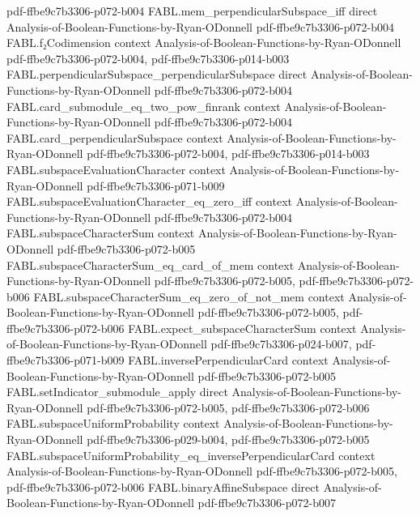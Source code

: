 \begin{theorem}
  {pdf-ffbe9c7b3306-p072-b004}
\proofstep
  {FABL.mem_perpendicularSubspace_iff}
  {direct}
  {Analysis-of-Boolean-Functions-by-Ryan-ODonnell}
  {pdf-ffbe9c7b3306-p072-b004}
\proofstep
  {FABL.f₂Codimension}
  {context}
  {Analysis-of-Boolean-Functions-by-Ryan-ODonnell}
  {pdf-ffbe9c7b3306-p072-b004,
    pdf-ffbe9c7b3306-p014-b003}
\proofstep
  {FABL.perpendicularSubspace_perpendicularSubspace}
  {direct}
  {Analysis-of-Boolean-Functions-by-Ryan-ODonnell}
  {pdf-ffbe9c7b3306-p072-b004}
\proofstep
  {FABL.card_submodule_eq_two_pow_finrank}
  {context}
  {Analysis-of-Boolean-Functions-by-Ryan-ODonnell}
  {pdf-ffbe9c7b3306-p072-b004}
\proofstep
  {FABL.card_perpendicularSubspace}
  {context}
  {Analysis-of-Boolean-Functions-by-Ryan-ODonnell}
  {pdf-ffbe9c7b3306-p072-b004,
    pdf-ffbe9c7b3306-p014-b003}
\proofstep
  {FABL.subspaceEvaluationCharacter}
  {context}
  {Analysis-of-Boolean-Functions-by-Ryan-ODonnell}
  {pdf-ffbe9c7b3306-p071-b009}
\proofstep
  {FABL.subspaceEvaluationCharacter_eq_zero_iff}
  {context}
  {Analysis-of-Boolean-Functions-by-Ryan-ODonnell}
  {pdf-ffbe9c7b3306-p072-b004}
\proofstep
  {FABL.subspaceCharacterSum}
  {context}
  {Analysis-of-Boolean-Functions-by-Ryan-ODonnell}
  {pdf-ffbe9c7b3306-p072-b005}
\proofstep
  {FABL.subspaceCharacterSum_eq_card_of_mem}
  {context}
  {Analysis-of-Boolean-Functions-by-Ryan-ODonnell}
  {pdf-ffbe9c7b3306-p072-b005,
    pdf-ffbe9c7b3306-p072-b006}
\proofstep
  {FABL.subspaceCharacterSum_eq_zero_of_not_mem}
  {context}
  {Analysis-of-Boolean-Functions-by-Ryan-ODonnell}
  {pdf-ffbe9c7b3306-p072-b005,
    pdf-ffbe9c7b3306-p072-b006}
\proofstep
  {FABL.expect_subspaceCharacterSum}
  {context}
  {Analysis-of-Boolean-Functions-by-Ryan-ODonnell}
  {pdf-ffbe9c7b3306-p024-b007,
    pdf-ffbe9c7b3306-p071-b009}
\proofstep
  {FABL.inversePerpendicularCard}
  {context}
  {Analysis-of-Boolean-Functions-by-Ryan-ODonnell}
  {pdf-ffbe9c7b3306-p072-b005}
\proofstep
  {FABL.setIndicator_submodule_apply}
  {direct}
  {Analysis-of-Boolean-Functions-by-Ryan-ODonnell}
  {pdf-ffbe9c7b3306-p072-b005,
    pdf-ffbe9c7b3306-p072-b006}
\proofstep
  {FABL.subspaceUniformProbability}
  {context}
  {Analysis-of-Boolean-Functions-by-Ryan-ODonnell}
  {pdf-ffbe9c7b3306-p029-b004,
    pdf-ffbe9c7b3306-p072-b005}
\proofstep
  {FABL.subspaceUniformProbability_eq_inversePerpendicularCard}
  {context}
  {Analysis-of-Boolean-Functions-by-Ryan-ODonnell}
  {pdf-ffbe9c7b3306-p072-b005,
    pdf-ffbe9c7b3306-p072-b006}
\proofstep
  {FABL.binaryAffineSubspace}
  {direct}
  {Analysis-of-Boolean-Functions-by-Ryan-ODonnell}
  {pdf-ffbe9c7b3306-p072-b007}

\end{theorem}
